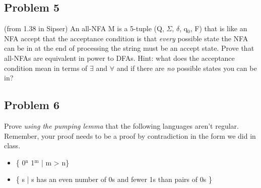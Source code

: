 \documentclass[11pt]{article}
\begin{document}
\subsection{Problem 5}
\label{sec-1-5}
(from 1.38 in Sipser) An all-NFA M is a 5-tuple (Q, $\Sigma$, $\delta$, q$_{\text{0}}$, F) that is like an NFA accept that the acceptance condition is that \emph{every} possible state the NFA can be in at the end of processing the string must be an accept state. Prove that all-NFAs are equivalent in power to DFAs. Hint: what does the acceptance condition mean in terms of $\exists$ and $\forall$ and if there are \emph{no} possible states you can be in?
\subsection{Problem 6}
\label{sec-1-6}
Prove \emph{using the pumping lemma} that the following languages aren't regular. Remember, your proof needs to be a proof by contradiction in the form we did in class. 
\begin{itemize}
\item \{ 0$^{\text{n}}$ 1$^{\text{m}}$ | m > n\}
\item \{ s | s has an even number of 0s and fewer 1s than pairs of 0s \}
\end{itemize}
\end{document}

